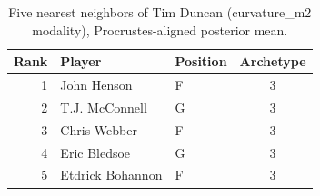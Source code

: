 \begin{table}[htbp]
  \centering\small
  \begin{tabular}{rllc}
    \toprule
    Rank & Player & Position & Archetype \\
    \midrule
    1 & John Henson & F & 3 \\
    2 & T.J. McConnell & G & 3 \\
    3 & Chris Webber & F & 3 \\
    4 & Eric Bledsoe & G & 3 \\
    5 & Etdrick Bohannon & F & 3 \\
    \bottomrule
  \end{tabular}
  \caption{Five nearest neighbors of Tim Duncan (curvature_m2 modality), Procrustes-aligned posterior mean.}
  \label{tab:Tim_Duncan_neighbors_curvature_m2}
\end{table}

